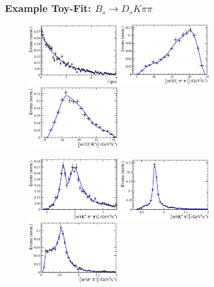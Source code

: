 \documentclass{beamer}
\begin{document}
\begin{frame}
	\frametitle{Example Toy-Fit: $B_s \to D_s K \pi \pi$}

	\centering
	
	\begin{figure}[hp]
	\centering
		\includegraphics[width=0.35\textwidth, height = 3.cm]{plots_toy/h_t.eps} 
		\includegraphics[width=0.35\textwidth, height = 3.cm]{plots_toy/s_Dspipi.eps} 
		\includegraphics[width=0.35\textwidth, height = 3.cm]{plots_toy/s_DsK.eps} 

		\includegraphics[width=0.35\textwidth, height = 3.cm]{plots_toy/s_Kpipi.eps} 
		\includegraphics[width=0.35\textwidth, height = 3.cm]{plots_toy/s_Kpi.eps} 
		\includegraphics[width=0.35\textwidth, height = 3.cm]{plots_toy/s_pipi.eps} 		
	\end{figure}				
\end{frame}
\end{document}
